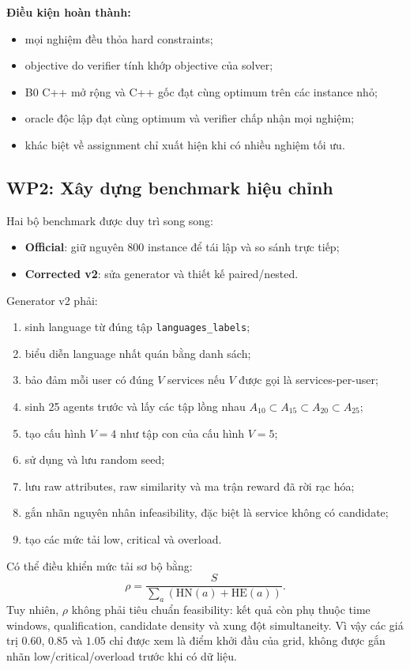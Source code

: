 \documentclass[12pt,a4paper]{article}
\newcommand{\HN}{\mathrm{HN}}
\newcommand{\HE}{\mathrm{HE}}
\begin{document}
\textbf{Điều kiện hoàn thành:}
\begin{itemize}
  \item mọi nghiệm đều thỏa hard constraints;
  \item objective do verifier tính khớp objective của solver;
  \item B0 C++ mở rộng và C++ gốc đạt cùng optimum trên các instance nhỏ;
  \item oracle độc lập đạt cùng optimum và verifier chấp nhận mọi nghiệm;
  \item khác biệt về assignment chỉ xuất hiện khi có nhiều nghiệm tối ưu.
\end{itemize}

\subsection{WP2: Xây dựng benchmark hiệu chỉnh}

Hai bộ benchmark được duy trì song song:
\begin{itemize}
  \item \textbf{Official}: giữ nguyên 800 instance để tái lập và so sánh trực tiếp;
  \item \textbf{Corrected v2}: sửa generator và thiết kế paired/nested.
\end{itemize}

Generator v2 phải:
\begin{enumerate}
  \item sinh language từ đúng tập \texttt{languages\_labels};
  \item biểu diễn language nhất quán bằng danh sách;
  \item bảo đảm mỗi user có đúng $V$ services nếu $V$ được gọi là
        services-per-user;
  \item sinh 25 agents trước và lấy các tập lồng nhau
        $A_{10}\subset A_{15}\subset A_{20}\subset A_{25}$;
  \item tạo cấu hình $V=4$ như tập con của cấu hình $V=5$;
  \item sử dụng và lưu random seed;
  \item lưu raw attributes, raw similarity và ma trận reward đã rời rạc hóa;
  \item gắn nhãn nguyên nhân infeasibility, đặc biệt là service không có candidate;
  \item tạo các mức tải low, critical và overload.
\end{enumerate}

Có thể điều khiển mức tải sơ bộ bằng:
\begin{equation}
  \rho=\frac{S}{\sum_a(\HN(a)+\HE(a))}.
\end{equation}
Tuy nhiên, $\rho$ không phải tiêu chuẩn feasibility: kết quả còn phụ thuộc time
windows, qualification, candidate density và xung đột simultaneity. Vì vậy các
giá trị $0.60$, $0.85$ và $1.05$ chỉ được xem là điểm khởi đầu của grid, không
được gắn nhãn low/critical/overload trước khi có dữ liệu.
\end{document}
